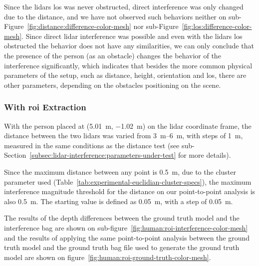 Since the \acp{lidar} \ac{los} was never obstructed, direct interference was only changed due to the distance, and we have not observed such behaviors neither on sub-Figure~\ref{fig:distance:difference-color-mesh} nor sub-Figure~\ref{fig:los:difference-color-mesh}. Since direct  \ac{lidar} interference was possible and even with the \acp{lidar} \ac{los} obstructed the behavior does not have any similarities, we can only conclude that the presence of the person (as an obstacle) changes the behavior of the interference significantly, which indicates that besides the more common physical parameters of the setup, such as distance, height, orientation and \ac{los}, there are other parameters, depending on the obstacles positioning on the scene.


\subsubsection{With \ac{roi} Extraction}
With the person placed at (\SI{5.01}{\meter}, \SI{-1.02}{\meter}) on the \ac{lidar} coordinate frame, the distance between the two \acp{lidar} was varied from \SIrange{3}{6}{\meter}, with steps of \SI{1}{\meter}, measured in the same conditions as the distance test (see sub-Section~\ref{subsec:lidar-interference:parameters-under-test} for more details).

Since the maximum distance between any point is \SI{0.5}{\meter}, due to the cluster parameter used (Table~\ref{tab:experimental-euclidian-cluster-specs}), the maximum interference magnitude threshold for the distance on our point-to-point analysis is also \SI{0.5}{\meter}. The starting value is defined as \SI{0.05}{\meter}, with a step of \SI{0.05}{\meter}.

The results of the depth differences between the ground truth model and the interference bag are shown on sub-figure~\ref{fig:human:roi-interference-color-mesh} and the results of applying the same point-to-point analysis between the ground truth model and the ground truth bag file used to generate the ground truth model are shown on figure~\ref{fig:human:roi-ground-truth-color-mesh}.

